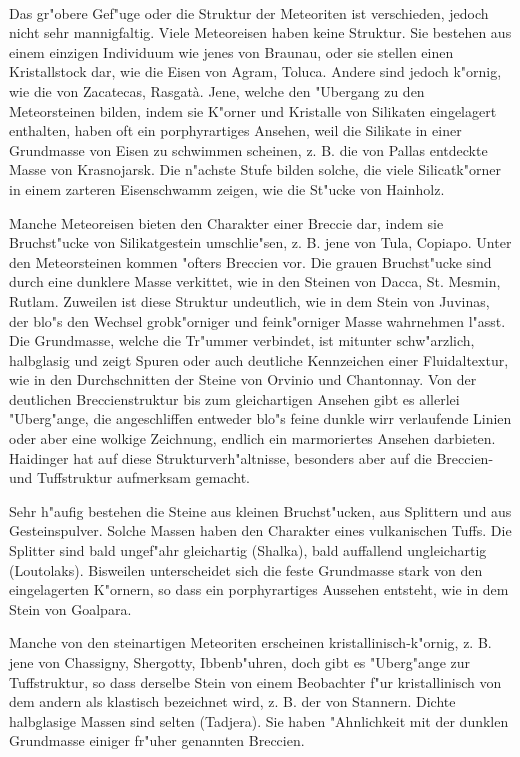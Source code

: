 \documentclass[a4paper, 11pt, oneside, polutonikogreek, german]{article}
\begin{document}
\paragraph*{}
Das gr"obere Gef"uge oder die Struktur der Meteoriten ist verschieden, jedoch nicht sehr mannigfaltig. Viele Meteoreisen haben keine Struktur. Sie bestehen aus einem einzigen Individuum wie jenes von Braunau, oder sie stellen einen Kristallstock dar, wie die Eisen von Agram, Toluca. Andere sind jedoch k"ornig, wie die von Zacatecas, Rasgatà. Jene, welche den "Ubergang zu den Meteorsteinen bilden, indem sie K"orner und Kristalle von Silikaten eingelagert enthalten, haben oft ein porphyrartiges Ansehen, weil die Silikate in einer Grundmasse von Eisen zu schwimmen scheinen, z. B. die von Pallas entdeckte Masse von Krasnojarsk. Die n"achste Stufe bilden solche, die viele Silicatk"orner in einem zarteren Eisenschwamm zeigen, wie die St"ucke von Hainholz.

Manche Meteoreisen bieten den Charakter einer Breccie dar, indem sie Bruchst"ucke von Silikatgestein umschlie"sen, z. B. jene von Tula, Copiapo. Unter den Meteorsteinen kommen "ofters Breccien vor. Die grauen Bruchst"ucke sind durch eine dunklere Masse verkittet, wie in den Steinen von Dacca, St. Mesmin, Rutlam. Zuweilen ist diese Struktur undeutlich, wie in dem Stein von Juvinas, der blo"s den Wechsel grobk"orniger und feink"orniger Masse wahrnehmen l"asst. Die Grundmasse, welche die Tr"ummer verbindet, ist mitunter schw"arzlich, halbglasig und zeigt Spuren oder auch deutliche Kennzeichen einer Fluidaltextur, wie in den Durchschnitten der Steine von Orvinio und Chantonnay. Von der deutlichen Breccienstruktur bis zum gleichartigen Ansehen gibt es allerlei "Uberg"ange, die angeschliffen entweder blo"s feine dunkle wirr verlaufende Linien oder aber eine wolkige Zeichnung, endlich ein marmoriertes Ansehen darbieten. Haidinger hat auf diese Strukturverh"altnisse, besonders aber auf die Breccien- und Tuffstruktur aufmerksam gemacht.

Sehr h"aufig bestehen die Steine aus kleinen Bruchst"ucken, aus Splittern und aus Gesteinspulver. Solche Massen haben den Charakter eines vulkanischen Tuffs. Die Splitter sind bald ungef"ahr gleichartig (Shalka), bald auffallend ungleichartig (Loutolaks). Bisweilen unterscheidet sich die feste Grundmasse stark von den eingelagerten K"ornern, so dass ein porphyrartiges Aussehen entsteht, wie in dem Stein von Goalpara.

Manche von den steinartigen Meteoriten erscheinen kristallinisch-k"ornig, z. B. jene von Chassigny, Shergotty, Ibbenb"uhren, doch gibt es "Uberg"ange zur Tuffstruktur, so dass derselbe Stein von einem Beobachter f"ur kristallinisch von dem andern als klastisch bezeichnet wird, z. B. der von Stannern. Dichte halbglasige Massen sind selten (Tadjera). Sie haben "Ahnlichkeit mit der dunklen Grundmasse einiger fr"uher genannten Breccien.
\end{document}
